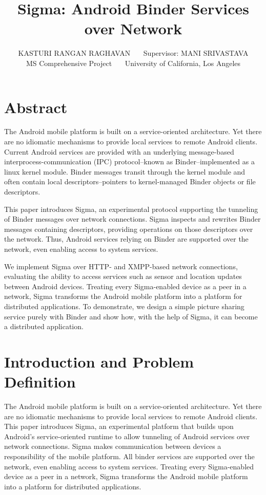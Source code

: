 \documentclass[prodmode]{acmlarge}
\title{Sigma: Android Binder Services over Network}
\author{KASTURI RANGAN RAGHAVAN~~~
Supervisor: MANI SRIVASTAVA\\
MS Comprehensive Project~~~
University of California, Los Angeles
}
\begin{document}
\pagestyle{plain}
\maketitle
\tableofcontents

\clearpage

\section{Abstract}
The Android mobile platform is built on a service-oriented architecture. Yet there are no idiomatic mechanisms to provide local services to remote Android clients. Current Android services are provided with an underlying message-based interprocess-communication (IPC) protocol--known as Binder--implemented as a linux kernel module. Binder messages transit through the kernel module and often contain local descriptors--pointers to kernel-managed Binder objects or file descriptors.

This paper introduces Sigma, an experimental protocol supporting the tunneling of Binder messages over network connections. Sigma inspects and rewrites Binder messages containing descriptors, providing operations on those descriptors over the network. Thus, Android services relying on Binder are supported over the network, even enabling access to system services.

We implement Sigma over HTTP- and XMPP-based network connections, evaluating the ability to access services such as sensor and location updates between Android devices. Treating every Sigma-enabled device as a peer in a network, Sigma transforms the Android mobile platform into a platform for distributed applications. To demonstrate, we design a simple picture sharing service purely with Binder and show how, with the help of Sigma, it can become a distributed application.

\section{Introduction and Problem Definition}

The Android mobile platform is built on a service-oriented architecture. Yet there are no idiomatic mechanisms to provide local services to remote Android clients. This paper introduces Sigma, an experimental platform that builds upon Android's service-oriented runtime to allow tunneling of Android services over network connections. Sigma makes communication between devices a responsibility of the mobile platform. All binder services are supported over the network, even enabling access to system services. Treating every Sigma-enabled device as a peer in a network, Sigma transforms the Android mobile platform into a platform for distributed applications.
\end{document}

